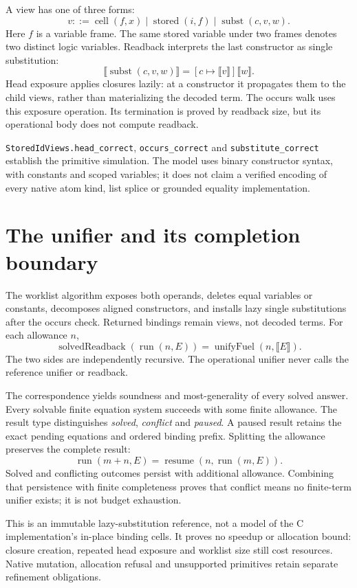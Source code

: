 \documentclass[11pt,a4paper]{article}
\newcommand{\code}[1]{\nolinkurl{#1}}
\begin{document}
A view has one of three forms:
\[
 v ::= \operatorname{cell}(f,x)\mid\operatorname{stored}(i,f)
       \mid\operatorname{subst}(c,v,w).
\]
Here $f$ is a variable frame. The same stored variable under two frames denotes
two distinct logic variables. Readback interprets the last constructor as
single substitution:
\[
 \llbracket\operatorname{subst}(c,v,w)\rrbracket
   =[c\mapsto\llbracket v\rrbracket]\llbracket w\rrbracket.
\]
Head exposure applies closures lazily: at a constructor it propagates them to
the child views, rather than materializing the decoded term. The occurs walk
uses this exposure operation. Its termination is proved by readback size,
but its operational body does not compute readback.

\code{StoredIdViews.head_correct}, \code{occurs_correct} and
\code{substitute_correct} establish the primitive simulation. The model uses
binary constructor syntax, with constants and scoped variables; it does not
claim a verified encoding of every native atom kind, list splice or grounded
equality implementation.

\section{The unifier and its completion boundary}

The worklist algorithm exposes both operands, deletes equal variables or
constants, decomposes aligned constructors, and installs lazy single
substitutions after the occurs check. Returned bindings remain views, not
decoded terms. For each allowance $n$,
\[
 \operatorname{solvedReadback}(\operatorname{run}(n,E))
     =\operatorname{unifyFuel}(n,\llbracket E\rrbracket).
\]
The two sides are independently recursive. The operational unifier never
calls the reference unifier or readback.

The correspondence yields soundness and most-generality of every solved
answer. Every solvable finite equation system succeeds with some finite
allowance. The result type distinguishes \emph{solved}, \emph{conflict} and
\emph{paused}. A paused result retains the exact pending equations and ordered
binding prefix. Splitting the allowance preserves the complete result:
\[
 \operatorname{run}(m+n,E)
    =\operatorname{resume}(n,\operatorname{run}(m,E)).
\]
Solved and conflicting outcomes persist with additional allowance. Combining
that persistence with finite completeness proves that conflict means no
finite-term unifier exists; it is not budget exhaustion.

This is an immutable lazy-substitution reference, not a model of the C
implementation's in-place binding cells. It proves no speedup or allocation
bound: closure creation, repeated head exposure and worklist size still cost
resources. Native mutation, allocation refusal and unsupported primitives
retain separate refinement obligations.
\end{document}
